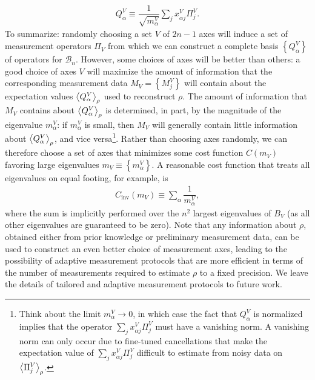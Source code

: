 \documentclass[nofootinbib,notitlepage,11pt]{revtex4-2}
\renewcommand{\t}{\text} %
\newcommand{\f}[2]{\dfrac{#1}{#2}} %
\newcommand{\p}[1]{\left(#1\right)} %
\renewcommand{\set}[1]{\left\{#1\right\}} %
\newcommand{\bk}{\Braket} %
\newcommand{\1}{\mathds{1}}
\newcommand{\B}{\mathcal{B}}
\begin{document}
\begin{align}
  Q^V_\alpha \equiv \f1{\sqrt{m^V_\alpha}} \sum_j x^V_{\alpha j} \Pi^V_j.
\end{align}
To summarize: randomly choosing a set $V$ of $2n-1$ axes will induce a set of measurement operators $\Pi_V$ from which we can construct a complete basis $\set{Q^V_\alpha}$ of operators for $\B_n$.
However, some choices of axes will be better than others: a good choice of axes $V$ will maximize the amount of information that the corresponding measurement data $M_V=\set{M^V_j}$ will contain about the expectation values $\bk{Q^V_\alpha}_\rho$ used to reconstruct $\rho$.
The amount of information that $M_V$ contains about $\bk{Q^V_\alpha}_\rho$ is determined, in part, by the magnitude of the eigenvalue $m^V_\alpha$: if $m^V_\alpha$ is small, then $M_V$ will generally contain little information about $\bk{Q^V_\alpha}_\rho$, and vice versa\footnote{Think about the limit $m^V_\alpha\to0$, in which case the fact that $Q^V_\alpha$ is normalized implies that the operator $\sum_j x^V_{\alpha j} \Pi^V_j$ must have a vanishing norm.
  A vanishing norm can only occur due to fine-tuned cancellations that make the expectation value of $\sum_j x^V_{\alpha j} \Pi^V_j$ difficult to estimate from noisy data on $\bk{\Pi^V_j}_\rho$.}.
Rather than choosing axes randomly, we can therefore choose a set of axes that minimizes some cost function $C\p{m_V}$ favoring large eigenvalues $m_V\equiv\set{m^V_\alpha}$.
A reasonable cost function that treats all eigenvalues on equal footing, for example, is
\begin{align}
  C_{\t{inv}}\p{m_V} \equiv \sum_\alpha \f1{m^V_\alpha},
\end{align}
where the sum is implicitly performed over the $n^2$ largest eigenvalues of $B_V$ (as all other eigenvalues are guaranteed to be zero).
Note that any information about $\rho$, obtained either from prior knowledge or preliminary measurement data, can be used to construct an even better choice of measurement axes, leading to the possibility of adaptive measurement protocols \cite{pereira2018adaptive} that are more efficient in terms of the number of measurements required to estimate $\rho$ to a fixed precision.
We leave the details of tailored and adaptive measurement protocols to future work.


\end{document}
